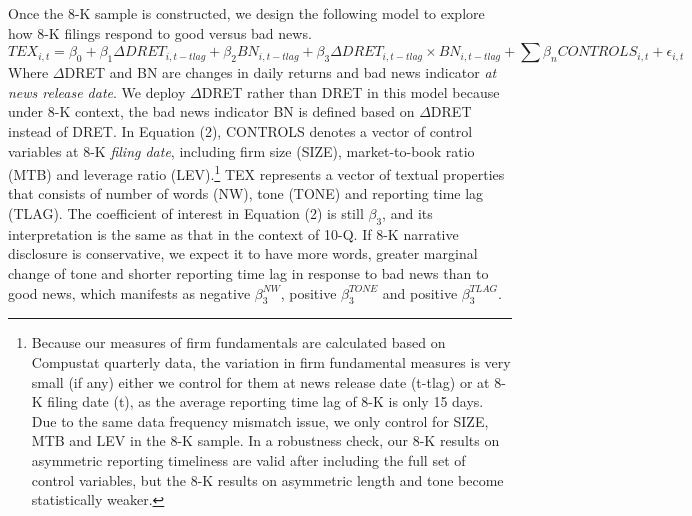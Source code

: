 \documentclass[letterpaper,12pt]{article}
\begin{document}
\begin{spacing}{1.5}
Once the 8-K sample is constructed, we design the following model to explore how 8-K filings respond to good versus bad news.
\begin{equation} \label{eq2}
TEX_{i,t}=\beta_0+\beta_1\Delta DRET_{i,t-tlag}+\beta_2BN_{i,t-tlag}+\beta_3\Delta DRET_{i,t-tlag}\times BN_{i,t-tlag}+\sum\beta_nCONTROLS_{i,t}+\epsilon_{i,t}
\end{equation}
Where $\Delta$DRET and BN are changes in daily returns and bad news indicator \textit{at news release date}. We deploy $\Delta$DRET rather than DRET in this model because under 8-K context, the bad news indicator BN is defined based on $\Delta$DRET instead of DRET. In Equation (2), CONTROLS denotes a vector of control variables at 8-K \textit{filing date}, including firm size (SIZE), market-to-book ratio (MTB) and leverage ratio (LEV).\footnote{Because our measures of firm fundamentals are calculated based on Compustat quarterly data, the variation in firm fundamental measures is very small (if any) either we control for them at news release date (t-tlag) or at 8-K filing date (t), as the average reporting time lag of 8-K is only 15 days. Due to the same data frequency mismatch issue, we only control for SIZE, MTB and LEV in the 8-K sample. In a robustness check, our 8-K results on asymmetric reporting timeliness are valid after including the full set of control variables, but the 8-K results on asymmetric length and tone become statistically weaker.} TEX represents a vector of textual properties that consists of number of words (NW), tone (TONE) and reporting time lag (TLAG). The coefficient of interest in Equation (2) is still $\beta_3$, and its interpretation is the same as that in the context of 10-Q. If 8-K narrative disclosure is conservative, we expect it to have more words, greater marginal change of tone and shorter reporting time lag in response to bad news than to good news, which manifests as negative $\beta_3^{NW}$, positive  $\beta_3^{TONE}$ and positive $\beta_3^{TLAG}$.


\end{spacing}
\end{document}
